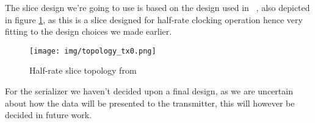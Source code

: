 The slice design we're going to use is based on the design used in ~\cite{menolfi2007a}, also depicted in figure \ref{fig:topology0}, as this is a slice designed for half-rate clocking operation hence very fitting to the design choices we made earlier.

\begin{figure}[H]
  \centering
  {\texttt{[image: img/topology\_tx0.png]}}
  \caption{Half-rate slice topology from ~\cite{menolfi2007a}}
  \label{fig:topology0}
\end{figure}

For the serializer we haven't decided upon a final design, as we are uncertain about how the data will be presented to the transmitter, this will however be decided in future work.